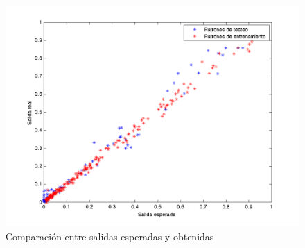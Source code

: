 \documentclass{sig-alternate}
\begin{document}
\begin{figure}[!ht]
	\includegraphics[scale=0.8]{./figures/mejorRealVsEsperada.png}
  \caption{Comparación entre salidas esperadas y obtenidas}
  \label{fig:errorEsperadoReal}
\end{figure}
\end{document}
